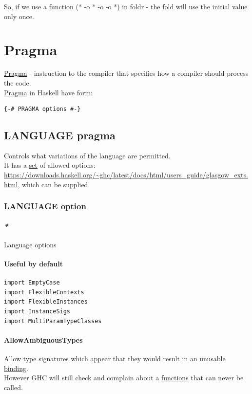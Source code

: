 \documentclass[a4paper,14pt,oneside]{book}
\begin{document}
So, if we use a \hyperref[org8cc2ae4]{function} (* -o * -o -o *) in foldr - the \hyperref[org06ab7f1]{fold} will use the initial value only once.\\

\chapter{\label{org086b82f}Pragma}
\label{sec:org4747516}
\hyperref[org086b82f]{Pragma} - instruction to the compiler that specifies how a compiler should process the code.\\
\hyperref[org086b82f]{Pragma} in Haskell have form:\\
\begin{verbatim}
{-# PRAGMA options #-}
\end{verbatim}

\section{\label{org32f39e3}LANGUAGE pragma}
\label{sec:orgdd8c73e}
Controls what variations of the language are permitted.\\
It has a \hyperref[orge119629]{set} of allowed options: \url{https://downloads.haskell.org/\~ghc/latest/docs/html/users\_guide/glasgow\_exts.html}, which can be supplied.\\

\subsection{\label{orgaa6df30}LANGUAGE option}
\label{sec:org9a2189a}

\subsubsection{\emph{*}}
\label{sec:org82c0fea}

\label{org4d69a2a}Language options\\

\subsubsection{Useful by default}
\label{sec:orgc3545b1}
\begin{verbatim}
import EmptyCase
import FlexibleContexts
import FlexibleInstances
import InstanceSigs
import MultiParamTypeClasses
\end{verbatim}

\subsubsection{\label{org54a046d}AllowAmbiguousTypes}
\label{sec:org9eafe2c}
Allow \hyperref[orgd6db20c]{type} signatures which appear that they would result in an unusable \hyperref[orgac1c0eb]{binding}.\\
However GHC will still check and complain about a \hyperref[org0bd6046]{functions} that can never be called.\\
\end{document}
